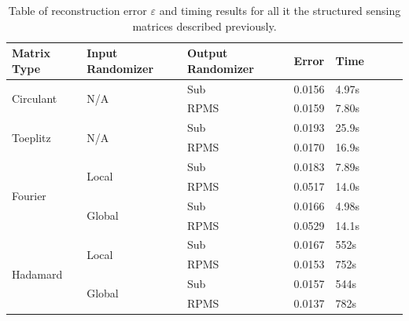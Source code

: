 \begin{table}[h] 
  \begin{tabular}{lll|lllll} 
    \textbf{Matrix Type}       & \textbf{Input Randomizer} & \textbf{Output Randomizer} & \textbf{Error} & \textbf{Time}  & \\ \hline
    \multirow{2}{*}{Circulant} & \multirow{2}{*}{N/A}      & Sub                        & 0.0156         & 4.97s          & \\
                               &                           & RPMS                       & 0.0159         & 7.80s          & \\ \hline
    \multirow{2}{*}{Toeplitz}  & \multirow{2}{*}{N/A}      & Sub                        & 0.0193         & 25.9s          & \\ 
                               &                           & RPMS                       & 0.0170         & 16.9s          & \\ \hline
    \multirow{4}{*}{Fourier}   & \multirow{2}{*}{Local}    & Sub                        & 0.0183         & 7.89s          & \\ 
                               &                           & RPMS                       & 0.0517         & 14.0s          & \\             
                               &  \multirow{2}{*}{Global}  & Sub                        & 0.0166         & 4.98s          & \\ 
                               &                           & RPMS                       & 0.0529         & 14.1s          & \\ \hline
    \multirow{4}{*}{Hadamard}  & \multirow{2}{*}{Local}    & Sub                        & 0.0167         & 552s           & \\
                               &                           & RPMS                       & 0.0153         & 752s           & \\
                               & \multirow{2}{*}{Global}   & Sub                        & 0.0157         & 544s           & \\
                               &                           & RPMS                       & 0.0137         & 782s           & \\
  \end{tabular} 
\caption{Table of reconstruction error $\varepsilon$ and timing results for all it the structured sensing matrices described previously.}
\label{tab:errors}
\end{table}


